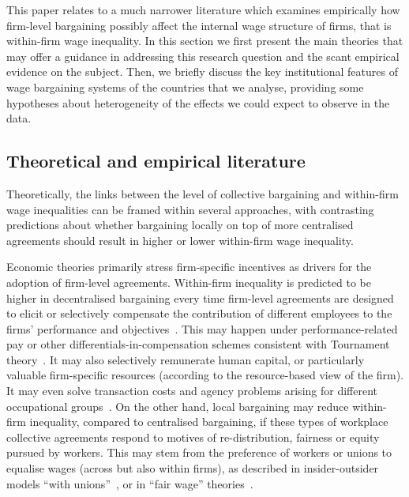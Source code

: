 \documentclass[12pt]{article}
\begin{document}
This paper relates to a much narrower literature which examines empirically how firm-level bargaining possibly affect the internal wage structure of firms, that is within-firm wage inequality. In this section we first present the main theories that may offer a guidance in addressing this research question and the scant empirical evidence on the subject. Then, we briefly discuss the key institutional features of wage bargaining systems of the countries that we analyse, providing some hypotheses about heterogeneity of the effects we could expect to observe in the data.  


\subsection{Theoretical and empirical literature}

Theoretically, the links between the level of collective bargaining and within-firm wage inequalities can be framed within several approaches, with contrasting predictions about whether bargaining locally on top of more centralised agreements should result in higher or lower within-firm wage inequality.

Economic theories primarily stress firm-specific incentives as drivers for the adoption of firm-level agreements. Within-firm inequality is predicted to be higher in decentralised bargaining every time firm-level agreements are designed to elicit or selectively compensate the contribution of different employees to the firms' performance and objectives~\citep{bayo2013diffusion}.
This may happen under performance-related pay or other differentials-in-compensation schemes consistent with Tournament theory~\citep{lazear.1979}. It may also selectively remunerate human capital, or particularly valuable firm-specific resources (according to the resource-based view of the firm). It may even solve transaction costs and agency problems arising for different occupational groups~\citep{eisenhardt1989agency,o1998structure}. On the other hand, local bargaining may reduce within-firm inequality, compared to centralised bargaining, if these types of workplace collective agreements respond to motives of re-distribution, fairness or equity pursued by workers. This may stem from the preference of workers or unions to equalise wages (across but also within firms), as described in insider-outsider models “with unions”~\citep{lindbeck1986wage,lindbeck2001insiders}, or in “fair wage” theories~\citep{akerlof.1984}. 
\end{document}
